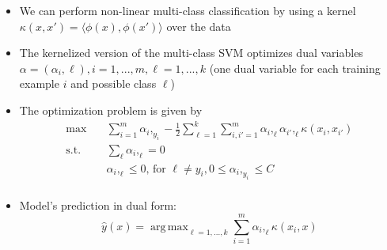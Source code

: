 \documentclass[12pt, a4paper]{article}
\DeclareMathOperator*{\argmax}{arg\,max} %
\begin{document}
\begin{itemize}
  \item We can perform non-linear multi-class classification by using a kernel $\kappa(x, x') = \langle\phi(x), \phi(x')\rangle$ over the data
  \item The kernelized version of the multi-class SVM optimizes dual variables $\alpha = (\alpha_i,\ell), i = 1,...,m, \ell = 1,...,k$ (one dual variable for each training example $i$ and possible class $\ell$)
  \item The optimization problem is given by
  $$
  \begin{aligned}
  \max \quad & \sum_{i=1}^m \alpha_i,_{y_i} - \frac{1}{2} \sum_{\ell=1}^k \sum_{i,i'=1}^m \alpha_i,_\ell \alpha_{i'},_\ell \kappa(x_i, x_{i'}) \\
  \textrm{s.t.} \quad & \sum_\ell \alpha_i,_\ell = 0 \\
    & \alpha_i,_\ell \leq 0 \text{, for } \ell \neq y_i, 0 \leq \alpha_i,_{y_i} \leq C \\
  \end{aligned}
  $$
  \item Model's prediction in dual form:
  $$
  \hat{y}(x) = \argmax_{\ell = 1,...,k} \sum_{i=1}^m \alpha_i,_\ell \kappa(x_i,x)
  $$
\end{itemize}
\end{document}

